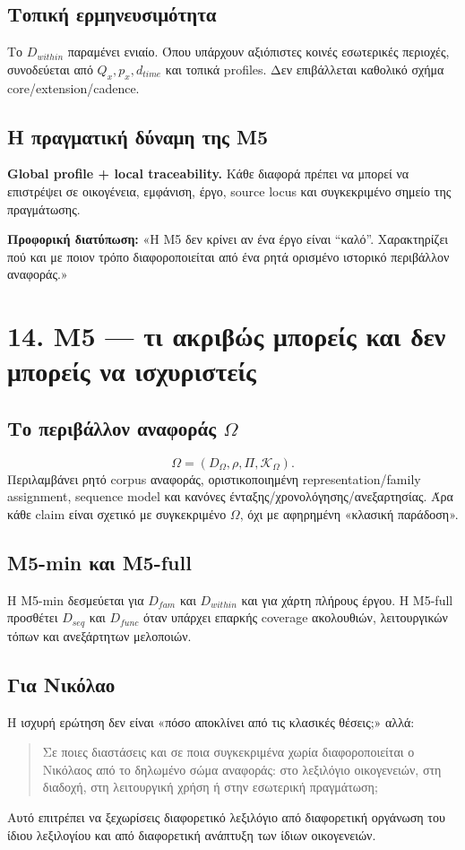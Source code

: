 \documentclass[9pt,a4paper]{extarticle}
\newcommand{\say}[1]{\begin{keybox}\textbf{Προφορική διατύπωση:} #1\end{keybox}}
\begin{document}
\subsection*{Τοπική ερμηνευσιμότητα}
Το \(D_{within}\) παραμένει ενιαίο. Όπου υπάρχουν αξιόπιστες κοινές εσωτερικές περιοχές, συνοδεύεται από \(Q_x,p_x,d_{time}\) και τοπικά profiles. Δεν επιβάλλεται καθολικό σχήμα core/extension/cadence.

\subsection*{Η πραγματική δύναμη της M5}
\textbf{Global profile + local traceability.} Κάθε διαφορά πρέπει να μπορεί να επιστρέψει σε οικογένεια, εμφάνιση, έργο, source locus και συγκεκριμένο σημείο της πραγμάτωσης.

\say{«Η M5 δεν κρίνει αν ένα έργο είναι “καλό”. Χαρακτηρίζει πού και με ποιον τρόπο διαφοροποιείται από ένα ρητά ορισμένο ιστορικό περιβάλλον αναφοράς.»}

\newpage
\section*{14. M5 — τι ακριβώς μπορείς και δεν μπορείς να ισχυριστείς}

\subsection*{Το περιβάλλον αναφοράς \(\Omega\)}
\[
\Omega=(D_\Omega,\rho,\Pi,\mathcal K_\Omega).
\]
Περιλαμβάνει ρητό corpus αναφοράς, οριστικοποιημένη representation/family assignment, sequence model και κανόνες ένταξης/χρονολόγησης/ανεξαρτησίας. Άρα κάθε claim είναι σχετικό με συγκεκριμένο \(\Omega\), όχι με αφηρημένη «κλασική παράδοση».

\subsection*{M5-min και M5-full}
Η M5-min δεσμεύεται για \(D_{fam}\) και \(D_{within}\) και για χάρτη πλήρους έργου. Η M5-full προσθέτει \(D_{seq}\) και \(D_{func}\) όταν υπάρχει επαρκής coverage ακολουθιών, λειτουργικών τόπων και ανεξάρτητων μελοποιών.

\subsection*{Για Νικόλαο}
Η ισχυρή ερώτηση δεν είναι «πόσο αποκλίνει από τις κλασικές θέσεις;» αλλά:
\begin{quote}
Σε ποιες διαστάσεις και σε ποια συγκεκριμένα χωρία διαφοροποιείται ο Νικόλαος από το δηλωμένο σώμα αναφοράς: στο λεξιλόγιο οικογενειών, στη διαδοχή, στη λειτουργική χρήση ή στην εσωτερική πραγμάτωση;
\end{quote}
Αυτό επιτρέπει να ξεχωρίσεις διαφορετικό λεξιλόγιο από διαφορετική οργάνωση του ίδιου λεξιλογίου και από διαφορετική ανάπτυξη των ίδιων οικογενειών.
\end{document}
